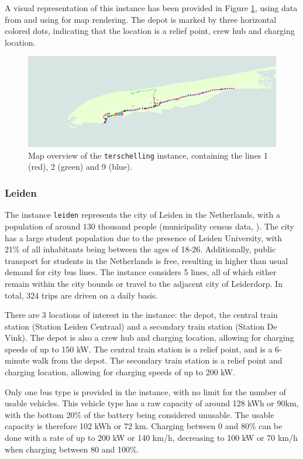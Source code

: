 \documentclass[]{article}
\begin{document}
A visual representation of this instance has been provided in Figure \ref{fig:terschelling-map}, using data from \citet{OpenStreetMap2025} and using \citet{QGIS2025} for map rendering. The depot is marked by three horizontal colored dots, indicating that the location is a relief point, crew hub and charging location. 

\begin{figure}[h]
  \centering
  \includegraphics[width=\textwidth]{images/terschelling-instance.png}
  \caption{Map overview of the \texttt{terschelling} instance, containing the lines 1 (red), 2 (green) and 9 (blue).}
  \label{fig:terschelling-map}
\end{figure}

\subsubsection{Leiden}
The instance \texttt{leiden} represents the city of Leiden in the Netherlands, with a population of around 130 thousand people (municipality census data, \citet{Leiden2025}). The city has a large student population due to the presence of Leiden University, with 21\% of all inhabitants being between the ages of 18-26. Additionally, public transport for students in the Netherlands is free, resulting in higher than usual demand for city bus lines. The instance considers 5 lines, all of which either remain within the city bounds or travel to the adjacent city of Leiderdorp. In total, 324 trips are driven on a daily basis. 

There are 3 locations of interest in the instance: the depot, the central train station (Station Leiden Centraal) and a secondary train station (Station De Vink). The depot is also a crew hub and charging location, allowing for charging speeds of up to 150 kW. The central train station is a relief point, and is a 6-minute walk from the depot. The secondary train station is a relief point and charging location, allowing for charging speeds of up to 200 kW.

Only one bus type is provided in the instance, with no limit for the number of usable vehicles. This vehicle type has a raw capacity of around 128 kWh or 90km, with the bottom 20\% of the battery being considered unusable. The usable capacity is therefore 102 kWh or 72 km. Charging between 0 and 80\% can be done with a rate of up to 200 kW or 140 km/h, decreasing to 100 kW or 70 km/h when charging between 80 and 100\%.
\end{document}
